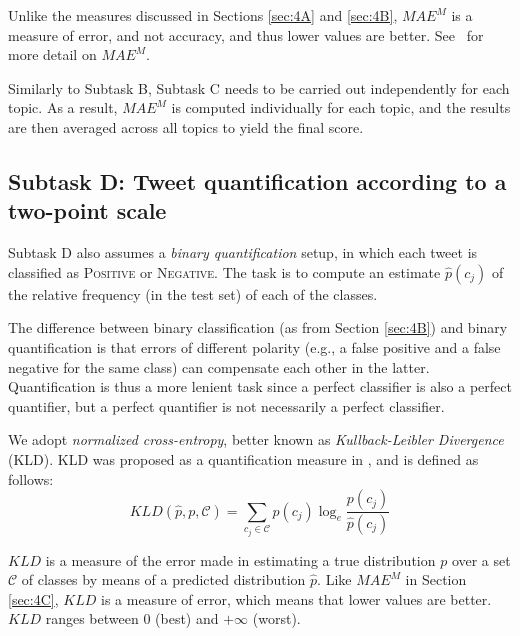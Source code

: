 \documentclass[11pt,letterpaper]{article}
\begin{document}
Unlike the measures discussed in Sections \ref{sec:4A} and
\ref{sec:4B}, $MAE^{M}$ is a measure of error, and not
accuracy, and thus lower values are better. See~\cite{Baccianella:2009qd}
for more detail on $MAE^{M}$.

Similarly to Subtask B, Subtask C needs to be carried out independently for
each topic. As a result, $MAE^{M}$ is computed individually for each
topic, and the results are then averaged across all topics to yield
the final score.


\subsection{Subtask D: Tweet quantification according to a two-point
scale}
\label{sec:4D}

\noindent Subtask D also assumes a \emph{binary quantification} setup,
in which each tweet is classified as
\textsc{Positive} or \textsc{Negative}. The task is to
compute an estimate $\hat{p}(c_{j})$ of
the relative frequency (in the test set) of each of the
classes.

The difference between binary classification (as from Section
\ref{sec:4B}) and binary quantification is that errors of different
polarity (e.g., a false positive and a false negative for the same
class) can compensate each other in the latter. Quantification is thus
a more lenient task
since a perfect classifier is also a perfect quantifier,
but a perfect quantifier is not necessarily a perfect classifier.

We adopt \emph{normalized cross-entropy},
better known as \emph{Kullback-Leibler Divergence} (KLD). KLD was
proposed as a quantification measure in \cite{Forman:2005fk}, and is
defined as follows:
%
\begin{equation}
  \label{eq:KLD}
  KLD(\hat{p},p,\mathcal{C}) = \sum_{c_{j}\in \mathcal{C}} 
  p(c_{j})\log_e\frac{p(c_{j})}{\hat{p}(c_{j})}
\end{equation}

$KLD$ is a measure of the error made in estimating a true
distribution $p$ over a set $\mathcal{C}$ of classes by means of a
predicted distribution $\hat{p}$. Like $MAE^{M}$ in Section
\ref{sec:4C}, $KLD$ is a measure of error, which means that lower values are
better. $KLD$ ranges between 0 (best) and $+\infty$ (worst).
\end{document}
